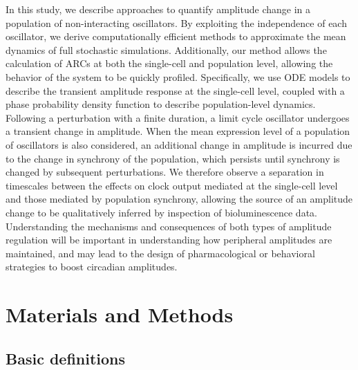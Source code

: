 \documentclass[11pt, letterpaper]{article}
\begin{document}
In this study, we describe approaches to quantify amplitude change in a population of non-interacting oscillators.
By exploiting the independence of each oscillator, we derive computationally efficient methods to approximate the mean dynamics of full stochastic simulations.
Additionally, our method allows the calculation of ARCs at both the single-cell and population level, allowing the behavior of the system to be quickly profiled.
Specifically, we use ODE models to describe the transient amplitude response at the single-cell level, coupled with a phase probability density function to describe population-level dynamics.
Following a perturbation with a finite duration, a limit cycle oscillator undergoes a transient change in amplitude.
When the mean expression level of a population of oscillators is also considered, an additional change in amplitude is incurred due to the change in synchrony of the population, which persists until synchrony is changed by subsequent perturbations.
We therefore observe a separation in timescales between the effects on clock output mediated at the single-cell level and those mediated by population synchrony, allowing the source of an amplitude change to be qualitatively inferred by inspection of bioluminescence data.
Understanding the mechanisms and consequences of both types of amplitude regulation will be important in understanding how peripheral amplitudes are maintained, and may lead to the design of pharmacological or behavioral strategies to boost circadian amplitudes.

\section*{Materials and Methods}

\subsection*{Basic definitions}
\end{document}
